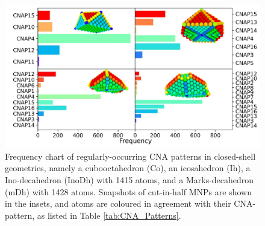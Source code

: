 \begin{figure}[ht!]
    \centering
    \includegraphics[width=14cm]{figures/Sapphire/CNA_Pats.pdf}
    \caption{Frequency chart of regularly-occurring CNA patterns in closed-shell geometries, namely a cubooctahedron (Co), an icosahedron (Ih), a Ino-decahedron (InoDh) with 1415 atoms, and a Marks-decahedron (mDh) with 1428 atoms. Snapshots of cut-in-half MNPs are shown in the insets, and atoms are coloured in agreement with their CNA-pattern, as listed in Table \ref{tab:CNA_Patterns}. }
    \label{fig:CNA_Patterns}
\end{figure}

